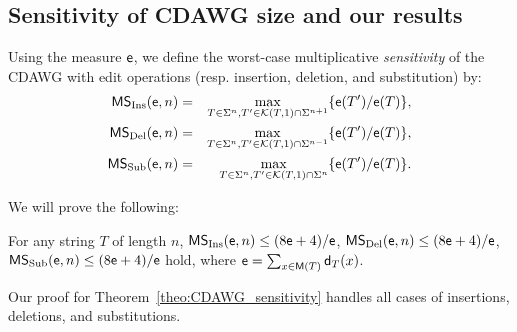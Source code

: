 \subsection{Sensitivity of CDAWG size and our results}

Using the measure $\mathsf{e}$, we define
the worst-case multiplicative \emph{sensitivity} of the CDAWG
with edit operations (resp. insertion, deletion, and substitution) by:
\begin{eqnarray*}
  \mathsf{MS}_{\mathrm{Ins}}(\mathsf{\mathsf{e}}, n) & = & \max_{T \in \Sigma^n, T' \in \mathcal{K}(T,1) \cap \Sigma^{n+1}} \{\mathsf{e}(T')/ \mathsf{e}(T)\}, \\
  \mathsf{MS}_{\mathrm{Del}}(\mathsf{e}, n) & = & \max_{T \in \Sigma^n, T' \in \mathcal{K}(T,1) \cap \Sigma^{n-1}} \{\mathsf{e}(T')/\mathsf{e}(T)\}, \\
  \mathsf{MS}_{\mathrm{Sub}}(\mathsf{e}, n) & = & \max_{T \in \Sigma^n, T' \in \mathcal{K}(T, 1) \cap \Sigma^{n}} \{\mathsf{e}(T')/\mathsf{e}(T)\}.
\end{eqnarray*}

We will prove the following:
\begin{theorem} \label{theo:CDAWG_sensitivity}
  For any string $T$ of length $n$,
  $\mathsf{MS}_{\mathrm{Ins}}(\mathsf{\mathsf{e}}, n) \leq (8\mathsf{e}+4)/\mathsf{e}$,
  $\mathsf{MS}_{\mathrm{Del}}(\mathsf{\mathsf{e}}, n) \leq (8\mathsf{e}+4)/\mathsf{e}$,
  $\mathsf{MS}_{\mathrm{Sub}}(\mathsf{\mathsf{e}}, n) \leq (8\mathsf{e}+4)/\mathsf{e}$ hold,
  where $\mathsf{e} = \sum_{x \in \mathsf{M}(T)}\mathsf{d}_T(x)$.
\end{theorem}

Our proof for Theorem~\ref{theo:CDAWG_sensitivity} 
handles all cases of insertions, deletions, and substitutions.

